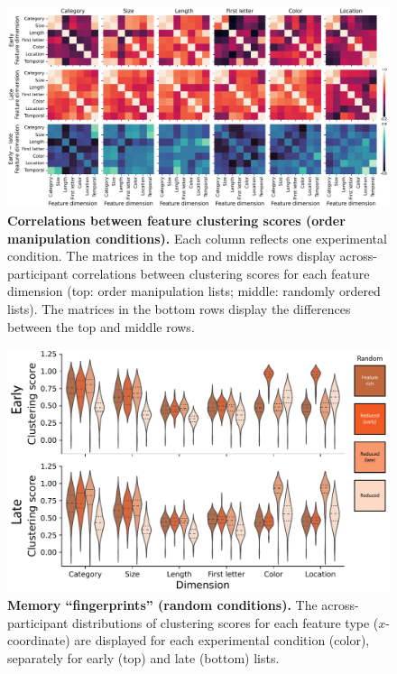 \documentclass{article}
\begin{document}
\begin{figure}[tp] \centering
    \includegraphics[width=\textwidth]{figures/clustering_correlations}
    
    \caption{\textbf{Correlations between feature clustering scores (order manipulation conditions).}  Each column reflects one experimental condition.  The matrices in the top and middle
    rows display across-participant correlations between clustering scores for each feature dimension (top: order manipulation lists; middle: randomly ordered lists).  The matrices
    in the bottom rows display the differences between the top and middle rows.}
        \label{fig:clustering-correlations}
\end{figure}


\begin{figure}[tp] \centering
    \includegraphics[width=\textwidth]{figures/fingerprints_random}
    
    \caption{\textbf{Memory ``fingerprints'' (random conditions).}
    The across-participant distributions of clustering scores for each feature
    type ($x$-coordinate) are displayed for each experimental condition
    (color), separately for early (top) and late (bottom) lists.}
        \label{fig:fingerprints-random}
\end{figure}
    
\end{document}
